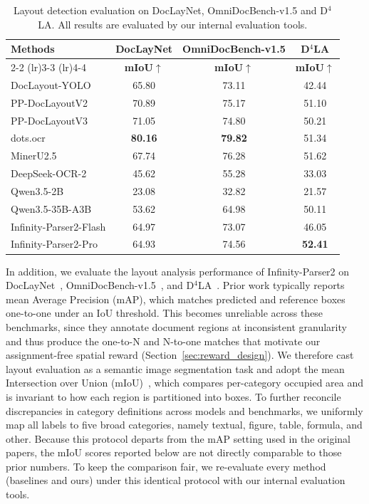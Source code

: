 \begin{table}[htbp]
\centering
\caption{Layout detection evaluation on DocLayNet, OmniDocBench-v1.5 and D$^4$LA. All results are evaluated by our internal evaluation tools.}
\label{tab:layout_analysis_public}
\small
\begin{tabular}{l c c c}
\toprule
\multirow{2}{*}{\textbf{Methods}} & \textbf{DocLayNet} & \textbf{OmniDocBench-v1.5} & \textbf{D$^4$LA} \\
\cmidrule(lr){2-2} \cmidrule(lr){3-3} \cmidrule(lr){4-4}
& \textbf{mIoU$\uparrow$} & \textbf{mIoU$\uparrow$} & \textbf{mIoU$\uparrow$}\\
\midrule
DocLayout-YOLO & 65.80 & 73.11 & 42.44 \\
PP-DocLayoutV2 & 70.89 & 75.17 & 51.10 \\
PP-DocLayoutV3 & 71.05 & 74.80 & 50.21 \\
\midrule
dots.ocr & \textbf{80.16} & \textbf{79.82} & 51.34 \\
MinerU2.5 & 67.74 & 76.28 & 51.62\\
DeepSeek-OCR-2 & 45.62 & 55.28 & 33.03 \\
\midrule
Qwen3.5-2B & 23.08 & 32.82 & 21.57 \\
Qwen3.5-35B-A3B & 53.62 & 64.98 & 50.11 \\
\midrule
Infinity-Parser2-Flash & 64.97 & 73.07 & 46.05 \\
Infinity-Parser2-Pro & 64.93 & 74.56 & \textbf{52.41} \\
\bottomrule
\end{tabular}
\end{table}

In addition, we evaluate the layout analysis performance of Infinity-Parser2 on DocLayNet~\cite{pfitzmann2022doclaynet}, OmniDocBench-v1.5~\cite{ouyang2025omnidocbench}, and D$^4$LA~\cite{da2023vgt}. Prior work typically reports mean Average Precision (mAP), which matches predicted and reference boxes one-to-one under an IoU threshold. This becomes unreliable across these benchmarks, since they annotate document regions at inconsistent granularity and thus produce the one-to-N and N-to-one matches that motivate our assignment-free spatial reward (Section~\ref{sec:reward_design}). We therefore cast layout evaluation as a semantic image segmentation task and adopt the mean Intersection over Union (mIoU)~\cite{chen2018encoder}, which compares per-category occupied area and is invariant to how each region is partitioned into boxes. To further reconcile discrepancies in category definitions across models and benchmarks, we uniformly map all labels to five broad categories, namely textual, figure, table, formula, and other. Because this protocol departs from the mAP setting used in the original papers, the mIoU scores reported below are not directly comparable to those prior numbers. To keep the comparison fair, we re-evaluate every method (baselines and ours) under this identical protocol with our internal evaluation tools.

